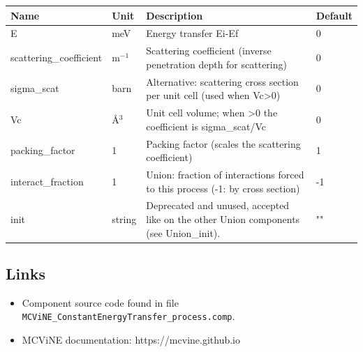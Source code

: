\begin{longtable}{p{}p{}p{}p{}}
\toprule
\textbf{Name} & \textbf{Unit} & \textbf{Description} & \textbf{Default} \\
\midrule
\endhead
E & meV & Energy transfer Ei-Ef & 0 \\
scattering\_coefficient & m$^{-1}$ & Scattering coefficient (inverse penetration depth for scattering) & 0 \\
sigma\_scat & barn & Alternative: scattering cross section per unit cell (used when Vc\textgreater{}0) & 0 \\
Vc & \AA{}$^{3}$ & Unit cell volume; when \textgreater{}0 the coefficient is sigma\_scat/Vc & 0 \\
packing\_factor & 1 & Packing factor (scales the scattering coefficient) & 1 \\
interact\_fraction & 1 & Union: fraction of interactions forced to this process (-1: by cross section) & -1 \\
init & string & Deprecated and unused, accepted like on the other Union components (see Union\_init). & "" \\
\bottomrule
\end{longtable}

\subsection*{Links}
\begin{itemize}
  \item Component source code found in file \texttt{MCViNE\_ConstantEnergyTransfer\_process.comp}.
  \item MCViNE documentation: https://mcvine.github.io
\end{itemize}
